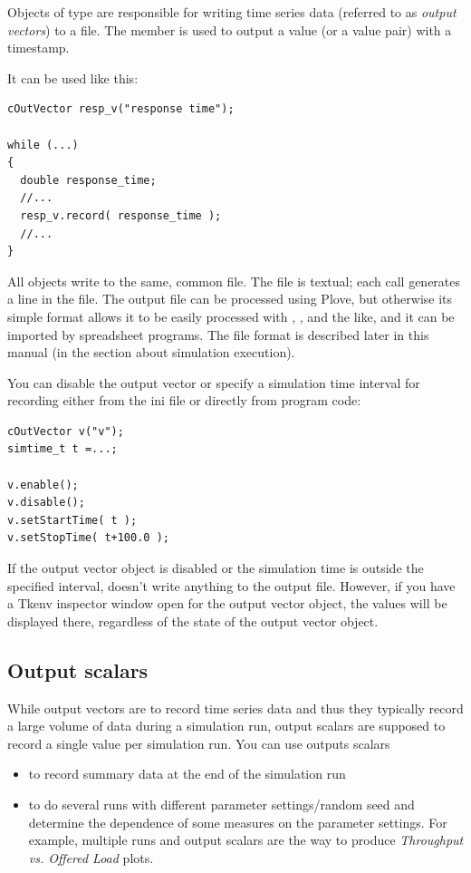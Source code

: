Objects of type  are responsible for writing time series
data (referred to as \textit{output vectors}) to a file. The 
member is used to output a value (or a value pair) with a timestamp.

It can be used like this:

\begin{verbatim}
cOutVector resp_v("response time");

while (...)
{
  double response_time;
  //...
  resp_v.record( response_time );
  //...
}
\end{verbatim}


All  objects write to the same, common file. The
file is textual; each  call generates a line in the
file. The output file can be processed using Plove, but otherwise its
simple format allows it to be easily processed with ,
,  and the like, and it can be imported by
spreadsheet programs.  The file format is described later in this
manual (in the section about simulation execution).

You can disable the output vector or specify a
simulation time interval for recording either from the ini file or
directly from program code:

\begin{verbatim}
cOutVector v("v");
simtime_t t =...;

v.enable();
v.disable();
v.setStartTime( t );
v.setStopTime( t+100.0 );
\end{verbatim}


If the output vector object is disabled or the simulation time is
outside the specified interval,  doesn't write
anything to the output file. However, if you have a Tkenv inspector
window open for the output vector object,
the values will be displayed there, regardless of the state of the
output vector object.





\subsection{Output scalars}

While output vectors are to record time series data and thus they
typically record a large volume of data during a simulation run,
output scalars are supposed to record a single
value per simulation run. You can use outputs scalars
\begin{itemize}
\item{to record summary data at the end of the simulation run}
\item{to do several runs with different parameter settings/random seed
    and determine the dependence of some measures on the parameter
    settings. For example, multiple runs and output scalars are the
    way to produce \textit{Throughput vs. Offered Load} plots.}
\end{itemize}

